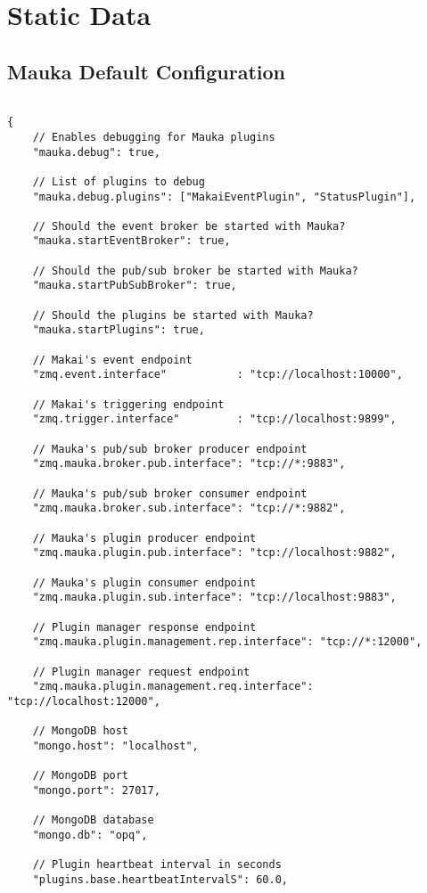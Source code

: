 \appendix
\section{Static Data}

\subsection{Mauka Default Configuration}
\label{appendix:MaukaConfig}
\begin{verbatim}

{
	// Enables debugging for Mauka plugins
	"mauka.debug": true,

	// List of plugins to debug
	"mauka.debug.plugins": ["MakaiEventPlugin", "StatusPlugin"],

	// Should the event broker be started with Mauka?
	"mauka.startEventBroker": true,

	// Should the pub/sub broker be started with Mauka?
	"mauka.startPubSubBroker": true,

	// Should the plugins be started with Mauka?
	"mauka.startPlugins": true,

	// Makai's event endpoint
	"zmq.event.interface"           : "tcp://localhost:10000",

	// Makai's triggering endpoint
	"zmq.trigger.interface"         : "tcp://localhost:9899",

	// Mauka's pub/sub broker producer endpoint
	"zmq.mauka.broker.pub.interface": "tcp://*:9883",

	// Mauka's pub/sub broker consumer endpoint
	"zmq.mauka.broker.sub.interface": "tcp://*:9882",

	// Mauka's plugin producer endpoint
	"zmq.mauka.plugin.pub.interface": "tcp://localhost:9882",

	// Mauka's plugin consumer endpoint
	"zmq.mauka.plugin.sub.interface": "tcp://localhost:9883",

	// Plugin manager response endpoint
	"zmq.mauka.plugin.management.rep.interface": "tcp://*:12000",

	// Plugin manager request endpoint
	"zmq.mauka.plugin.management.req.interface": "tcp://localhost:12000",

	// MongoDB host
	"mongo.host": "localhost",

	// MongoDB port
	"mongo.port": 27017,

	// MongoDB database
	"mongo.db": "opq",

	// Plugin heartbeat interval in seconds
	"plugins.base.heartbeatIntervalS": 60.0,


\end{verbatim}
